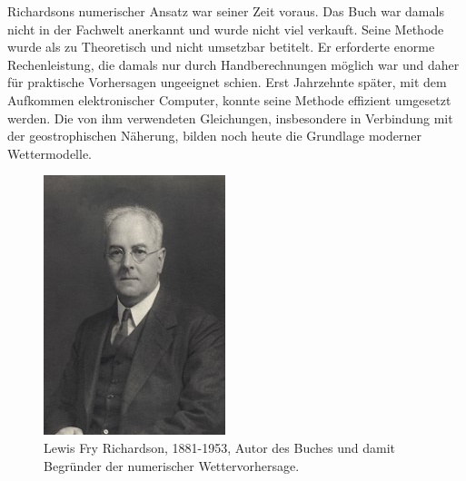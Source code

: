 Richardsons numerischer Ansatz war seiner Zeit voraus.
Das Buch war damals nicht in der Fachwelt anerkannt und wurde nicht viel verkauft. 
Seine Methode wurde als zu Theoretisch und nicht umsetzbar betitelt. 
Er erforderte enorme Rechenleistung, die damals nur durch Handberechnungen möglich war und daher für praktische Vorhersagen ungeeignet schien.  
Erst Jahrzehnte später, mit dem Aufkommen elektronischer Computer, konnte seine Methode effizient umgesetzt werden.  
Die von ihm verwendeten Gleichungen, insbesondere in Verbindung mit der geostrophischen Näherung, bilden noch heute die Grundlage moderner Wettermodelle.

\begin{figure}[h]
	\centering
	\includegraphics{Portrait_Richardson.jpg}
	\caption{Lewis Fry Richardson, 1881-1953, Autor des Buches \cite{geostrophisch:wpbnp} und damit Begründer der numerischer Wettervorhersage.}
	\label{bild:portraitRichi}
\end{figure}







